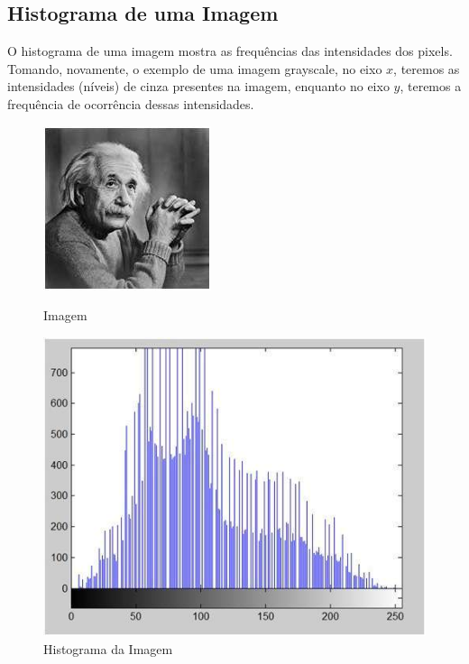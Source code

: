 \documentclass[a4paper, 12pt]{article}
\begin{document}
\subsection{Histograma de uma Imagem}
O histograma de uma imagem mostra as frequências das intensidades dos pixels. Tomando, novamente, o exemplo de uma imagem grayscale, no eixo $x$, teremos 
as intensidades (níveis) de cinza presentes na imagem, enquanto no eixo $y$, teremos a frequência de ocorrência dessas intensidades.
\\
\begin{figure}[!htb]
	\centering
	  \includegraphics[width=\linewidth]{images/einsteinNitido.jpg}
	  \caption{Imagem}
	\endminipage\hspace{1cm}
	  \includegraphics[scale=0.3]{images/histograma.jpg}
	  \caption{Histograma da Imagem}
	\endminipage
\end{figure}
\end{document}
